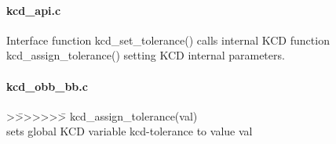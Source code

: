 \paragraph{kcd\_api.c}
 Interface function kcd\_set\_tolerance() calls internal KCD function
 kcd\_assign\_tolerance() setting KCD internal parameters.
\paragraph{kcd\_obb\_bb.c}
\begin{tabbing}
\vspace{-10mm}
>\=>>>>>>\= \kill
kcd\_assign\_tolerance(val)\\
\>       sets global KCD variable kcd-tolerance to value val
\vspace{-4mm}
\end{tabbing}
